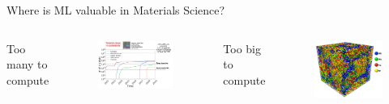 \documentclass[aspectratio=169]{beamer}
\begin{document}
    \begin{frame}[t]{Where is ML valuable in Materials Science?}
        \begin{columns}[t]
            Too many to compute
            \begin{figure}
                \centering
                \includegraphics[width=\textwidth]{figures/mp_data_hist.png}
            \end{figure}
            Too big to compute
            \begin{figure}
                \centering
                \includegraphics[width=\textwidth]{figures/mpea_poly.png}
            \end{figure}

\end{columns}
\end{frame}
\end{document}
